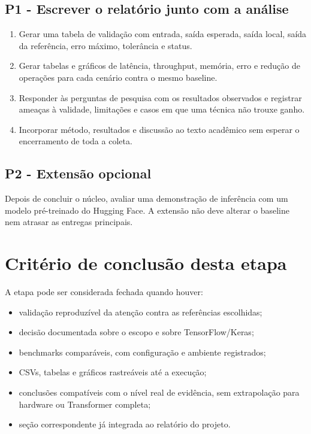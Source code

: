 \subsection{P1 - Escrever o relatório junto com a análise}


\begin{enumerate}
\item Gerar uma tabela de validação com entrada, saída esperada, saída local, saída
da referência, erro máximo, tolerância e status.
\item Gerar tabelas e gráficos de latência, throughput, memória, erro e redução de
operações para cada cenário contra o mesmo baseline.
\item Responder às perguntas de pesquisa com os resultados observados e registrar
ameaças à validade, limitações e casos em que uma técnica não trouxe ganho.
\item Incorporar método, resultados e discussão ao texto acadêmico sem esperar o
encerramento de toda a coleta.
\end{enumerate}


\subsection{P2 - Extensão opcional}





Depois de concluir o núcleo, avaliar uma demonstração de inferência com um modelo pré-treinado do Hugging Face. A extensão não deve alterar o baseline nem atrasar as entregas principais.



\section{Critério de conclusão desta etapa}



A etapa pode ser considerada fechada quando houver:


\begin{itemize}
\item validação reproduzível da atenção contra as referências escolhidas;
\item decisão documentada sobre o escopo e sobre TensorFlow/Keras;
\item benchmarks comparáveis, com configuração e ambiente registrados;
\item CSVs, tabelas e gráficos rastreáveis até a execução;
\item conclusões compatíveis com o nível real de evidência, sem extrapolação para
hardware ou Transformer completa;
\item seção correspondente já integrada ao relatório do projeto.
\end{itemize}


